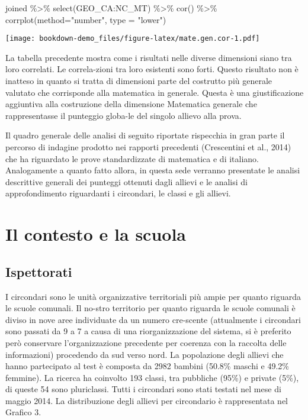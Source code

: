 \documentclass[
]{book}
\newenvironment{Shaded}{\begin{snugshade}}{\end{snugshade}}
\newcommand{\AttributeTok}[1]{\textcolor[rgb]{0.77,0.63,0.00}{#1}}
\newcommand{\FunctionTok}[1]{\textcolor[rgb]{0.00,0.00,0.00}{#1}}
\newcommand{\NormalTok}[1]{#1}
\newcommand{\SpecialCharTok}[1]{\textcolor[rgb]{0.00,0.00,0.00}{#1}}
\newcommand{\StringTok}[1]{\textcolor[rgb]{0.31,0.60,0.02}{#1}}
\begin{document}
\begin{Shaded}
\begin{Highlighting}[]
\NormalTok{joined }\SpecialCharTok{\%\textgreater{}\%} \FunctionTok{select}\NormalTok{(GEO\_CA}\SpecialCharTok{:}\NormalTok{NC\_MT) }\SpecialCharTok{\%\textgreater{}\%}
  \FunctionTok{cor}\NormalTok{() }\SpecialCharTok{\%\textgreater{}\%}
  \FunctionTok{corrplot}\NormalTok{(}\AttributeTok{method=}\StringTok{"number"}\NormalTok{, }\AttributeTok{type =} \StringTok{"lower"}\NormalTok{)}
\end{Highlighting}
\end{Shaded}

\texttt{[image: bookdown-demo\_files/figure-latex/mate.gen.cor-1.pdf]}

La tabella precedente mostra come i risultati nelle diverse dimensioni siano tra loro correlati. Le correla-zioni tra loro esistenti sono forti. Questo risultato non è inatteso in quanto si tratta di dimensioni parte del costrutto più generale valutato che corrisponde alla matematica in generale. Questa è una giustificazione aggiuntiva alla costruzione della dimensione Matematica generale che rappresentasse il punteggio globa-le del singolo allievo alla prova.

Il quadro generale delle analisi di seguito riportate rispecchia in gran parte il percorso di indagine prodotto nei rapporti precedenti (Crescentini et al., 2014) che ha riguardato le prove standardizzate di matematica e di italiano. Analogamente a quanto fatto allora, in questa sede verranno presentate le analisi descrittive generali dei punteggi ottenuti dagli allievi e le analisi di approfondimento riguardanti i circondari, le classi e gli allievi.

\hypertarget{il-contesto-e-la-scuola}{%
\chapter{Il contesto e la scuola}\label{il-contesto-e-la-scuola}}

\hypertarget{ispettorati}{%
\section{Ispettorati}\label{ispettorati}}

I circondari sono le unità organizzative territoriali più ampie per quanto riguarda le scuole comunali. Il no-stro territorio per quanto riguarda le scuole comunali è diviso in nove aree individuate da un numero cre-scente (attualmente i circondari sono passati da 9 a 7 a causa di una riorganizzazione del sistema, si è preferito però conservare l'organizzazione precedente per coerenza con la raccolta delle informazioni) procedendo da sud verso nord. La popolazione degli allievi che hanno partecipato al test è composta da 2982 bambini (50.8\% maschi e 49.2\% femmine). La ricerca ha coinvolto 193 classi, tra pubbliche (95\%) e private (5\%), di queste 54 sono pluriclassi. Tutti i circondari sono stati testati nel mese di maggio 2014. La distribuzione degli allievi per circondario è rappresentata nel Grafico 3.
\end{document}
